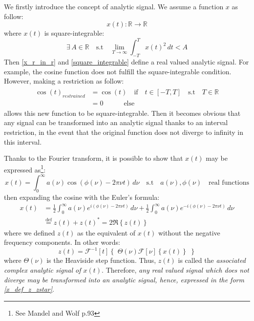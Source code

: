 \documentclass[11pt]{report}
\begin{document}
We firstly introduce the concept of analytic signal. We assume a function $x$ as follow:
\begin{equation}
\label{x_r_in_r}
x(t): \mathbb{R} \rightarrow \mathbb{R}
\end{equation}
where $x(t)$ is square-integrable:
\begin{equation}
\label{square_integrable}
\exists \, A \in \mathbb{R} \quad \textrm{s.t} \quad \lim_{T\to\infty} \int_{-T}^{T} x(t)^2\,dt < A
\end{equation}
Then \eqref{x_r_in_r} and \eqref{square_integrable} define a real valued analytic signal. For example, the cosine function does not fulfill the square-integrable condition. However, making a restriction as follow:
\begin{align}
\begin{split}
\cos(t)_{restrained}& = \cos(t) \quad \textrm{if} \quad t \in \left[ -T, T \right] \quad \textrm{s.t} \quad T \in \mathbb{R}\\
&= 0 \quad \quad \quad \textrm{else}
\end{split}
\end{align}
allows this new function to be square-integrable. Then it becomes obvious that any signal can be transformed into an analytic signal thanks to an interval restriction, in the event that the original function does not diverge to infinity in this interval.

Thanks to the Fourier transform, it is possible to show that $x(t)$ may be expressed as\footnote{See Mandel and Wolf p.93}:
\begin{equation}
x(t) = \int_0^\infty a(\nu)\cos(\phi(\nu)-2\pi\nu t)\,d\nu \quad \textrm{s.t} \quad a(\nu),\phi(\nu) \quad \textrm{real functions}
\end{equation}
then expanding the cosine with the Euler's formula:
\begin{align}
x(t) &= \frac{1}{2}\int_0^\infty a(\nu)e^{i(\phi(\nu)-2\pi\nu t)}\,d\nu + \frac{1}{2}\int_0^\infty a(\nu)e^{-i(\phi(\nu)-2\pi\nu t)}\,d\nu\\
\label{x_def_z_zstar}
&\stackrel{\text{def}}{=} z(t) + z(t)^* = 2\Re\left\lbrace z(t) \right\rbrace
\end{align}
where we defined $z(t)$ as the equivalent of $x(t)$ without the negative frequency components. In other words:
\begin{equation}
z(t) = \mathscr{F}^{-1} \left[ t \right]\left\lbrace \,\, \Theta(\nu) \mathscr{F}\left[ \nu \right] \left\lbrace x(t) \right\rbrace \,\, \right\rbrace
\end{equation}
where $\Theta(\nu)$ is the Heaviside step function. Thus, $z(t)$ is called the \textit{associated complex analytic signal of $x(t)$}. Therefore, \textit{any real valued signal which does not diverge may be transformed into an analytic signal, hence, expressed in the form \eqref{x_def_z_zstar}}.
\end{document}
